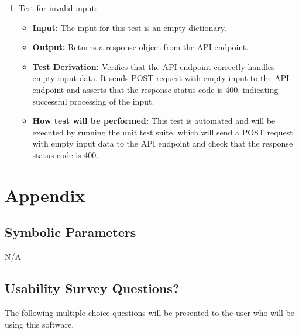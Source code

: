 \documentclass[12pt, titlepage]{article}
\begin{document}
\begin{enumerate}
    \item Test for invalid input:
    \begin{itemize}
      \item \textbf{Input:} The input for this test is an empty dictionary. 
      \item \textbf{Output:} Returns a response object from the API endpoint. 
      \item \textbf{Test Derivation:} Verifies that the API endpoint correctly handles empty input data. It sends POST request with empty input to the API endpoint and asserts that the response status code is 400, indicating successful processing of the input.
      \item \textbf{How test will be performed:} This test is automated and will be executed by running the unit test suite, which will send a POST request with empty input data to the API endpoint and check that the response status code is 400.
    \end{itemize}
\end{enumerate}

\newpage
				






\newpage

\section{Appendix} \label{section:6}

\subsection{Symbolic Parameters}  \label{section:6.1}

N/A

\subsection{Usability Survey Questions?} \label{section:6.2}


The following multiple choice questions will be presented to the user who will be using this software.
\end{document}
